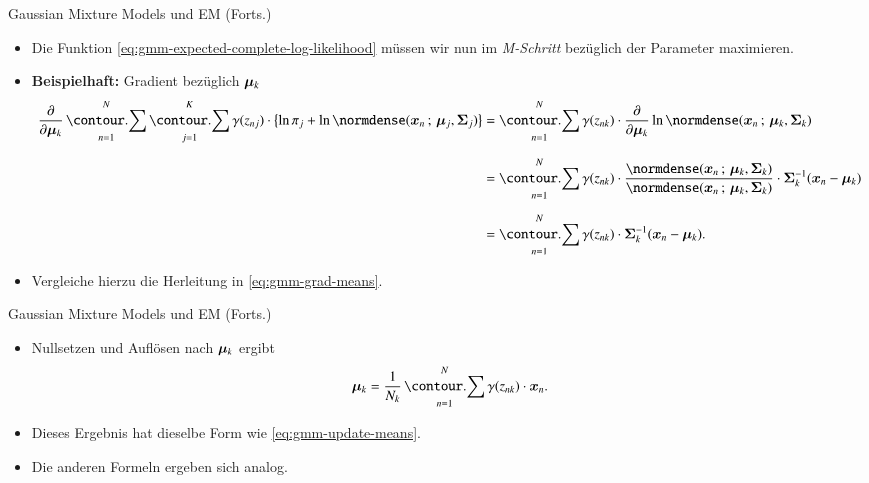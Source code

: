 \begin{frame}{Gaussian Mixture Models und EM (Forts.)}{}
	\begin{itemize}
		\item Die Funktion \eqref{eq:gmm-expected-complete-log-likelihood} müssen wir nun im \textit{M-Schritt} bezüglich der Parameter maximieren.
		\item \textbf{Beispielhaft:} Gradient bezüglich $\bm{\mu}_k$
		\begin{align*}
			\frac{\partial}{\partial \bmu_k} \sum_{n=1}^N \sum_{j=1}^K \gamma(z_{nj})
			\cdot \bigl\{ \ln \pi_j + \ln \normdense(\bx_n \param \bmu_j, \bSigma_j) \bigr\}
				&= \sum_{n=1}^N \gamma(z_{nk}) \cdot \frac{\partial}{\partial \bmu_k} \ln \normdense(\bx_n \param \bmu_k, \bSigma_k)
		\\[2mm]
				&= \sum_{n=1}^N \gamma(z_{nk}) \cdot \frac{
					\normdense(\bx_n \param \bmu_k, \bSigma_k)
				}{
					\normdense(\bx_n \param \bmu_k, \bSigma_k)} \cdot \bSigma_k^{-1} (\bx_n - \bmu_k)
		\\[2mm]
				&= \sum_{n=1}^N \gamma(z_{nk}) \cdot \bSigma_k^{-1} (\bx_n - \bmu_k).
		\end{align*}
		\item Vergleiche hierzu die Herleitung in \eqref{eq:gmm-grad-means}.
	\end{itemize}
\end{frame}


\begin{frame}{Gaussian Mixture Models und EM (Forts.)}{}
	\begin{itemize}
		\item Nullsetzen und Auflösen nach $\bm{\mu}_k$ ergibt
		\begin{equation*}
			\bmu_k = \frac{1}{N_k} \sum_{n=1}^N \gamma(z_{nk}) \cdot \bx_n.
		\end{equation*}
		\item Dieses Ergebnis hat dieselbe Form wie \eqref{eq:gmm-update-means}.
		\item Die anderen Formeln ergeben sich analog.
	\end{itemize}
\end{frame}